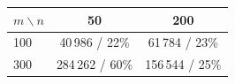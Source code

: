 \begin{tabular}{lcc}
\toprule
$m\backslash n$ & 50 & 200 \\
\midrule
100 & 40\,986 / 22\% & 61\,784 / 23\% \\
300 & 284\,262 / 60\% & 156\,544 / 25\% \\
\bottomrule
\end{tabular}